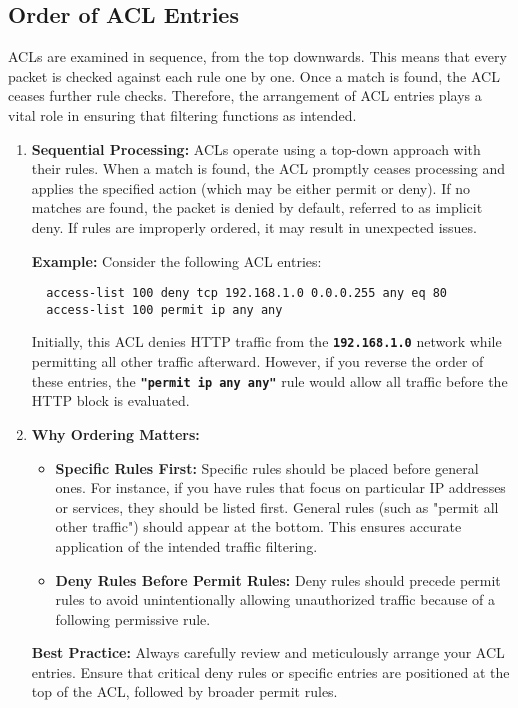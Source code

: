 \documentclass[11pt,a4paper]{article}
\begin{document}
    \subsection*{Order of ACL Entries}
        ACLs are examined in sequence, from the top downwards. This means that every packet is checked against each rule one by one. Once a match is found, the ACL ceases further rule checks. Therefore, the arrangement of ACL entries plays a vital role in ensuring that filtering functions as intended.
        \begin{enumerate}
            \item \textbf{Sequential Processing:} ACLs operate using a top-down approach with their rules. When a match is found, the ACL promptly ceases processing and applies the specified action (which may be either permit or deny). If no matches are found, the packet is denied by default, referred to as implicit deny. If rules are improperly ordered, it may result in unexpected issues.
            
            \textbf{Example:} Consider the following ACL entries:
\begin{lstlisting}
  access-list 100 deny tcp 192.168.1.0 0.0.0.255 any eq 80
  access-list 100 permit ip any any
\end{lstlisting}
            Initially, this ACL denies HTTP traffic from the \textbf{\lstinline{192.168.1.0}} network while permitting all other traffic afterward. However, if you reverse the order of these entries, the \textbf{\lstinline{"permit ip any any"}} rule would allow all traffic before the HTTP block is evaluated.

            \item \textbf{Why Ordering Matters:} 
                \begin{itemize}
                    \item \textbf{Specific Rules First:} Specific rules should be placed before general ones. For instance, if you have rules that focus on particular IP addresses or services, they should be listed first. General rules (such as "permit all other traffic") should appear at the bottom. This ensures accurate application of the intended traffic filtering.
                    \\[1em]
                    \item \textbf{Deny Rules Before Permit Rules:} Deny rules should precede permit rules to avoid unintentionally allowing unauthorized traffic because of a following permissive rule.
                \end{itemize}
                \textbf{Best Practice:} Always carefully review and meticulously arrange your ACL entries. Ensure that critical deny rules or specific entries are positioned at the top of the ACL, followed by broader permit rules.

        \end{enumerate}
\end{document}
